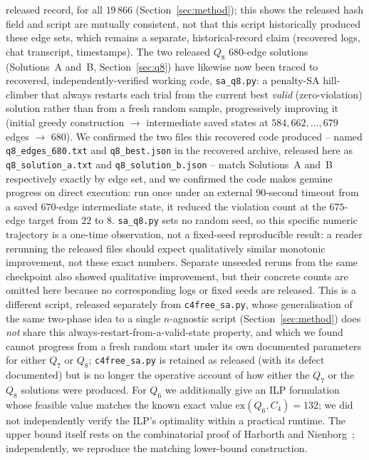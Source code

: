 \documentclass[12pt,a4paper]{article}
\theoremstyle{definition}
\newcommand{\ex}{\mathrm{ex}}
\begin{document}
released record, for all $19\,866$ (Section~\ref{sec:method}); this
shows the released hash field and script are mutually consistent, not
that this script historically produced these edge sets, which remains
a separate, historical-record claim (recovered logs, chat transcript,
timestamps). The two released
$Q_8$ $680$-edge solutions (Solutions~A and~B, Section~\ref{sec:q8})
have likewise now been traced to recovered, independently-verified
working code, \texttt{sa\_q8.py}: a penalty-SA hill-climber that always
restarts each trial from the current best \emph{valid} (zero-violation)
solution rather than from a fresh random sample, progressively
improving it (initial greedy construction $\to$ intermediate saved
states at $584,662,\ldots,679$ edges $\to$ $680$). We confirmed the two
files this recovered code produced -- named \texttt{q8\_edges\_680.txt}
and \texttt{q8\_best.json} in the recovered archive, released here as
\texttt{q8\_solution\_a.txt} and \texttt{q8\_solution\_b.json} -- match Solutions~A and~B respectively
exactly by edge set, and we confirmed the code makes genuine
progress on direct execution: run once under an external $90$-second
timeout from a saved
$670$-edge intermediate state, it reduced the violation count at the
$675$-edge target from $22$ to $8$. \texttt{sa\_q8.py} sets no random
seed, so this specific numeric trajectory is a one-time observation,
not a fixed-seed reproducible result: a reader rerunning the released
files should expect qualitatively similar monotonic improvement, not
these exact numbers. Separate unseeded reruns from the same checkpoint
also showed qualitative improvement, but their concrete counts are omitted
here because no corresponding logs or fixed seeds are released. This is a different script,
released separately from \texttt{c4free\_sa.py}, whose
generalisation of the same two-phase idea to a single $n$-agnostic
script (Section~\ref{sec:method}) does \emph{not} share this
always-restart-from-a-valid-state property, and which we found cannot
progress from a fresh random start under its own documented parameters
for either $Q_7$ or $Q_8$; \texttt{c4free\_sa.py} is retained as
released (with its defect documented) but is no longer the operative
account of how either the $Q_7$ or the $Q_8$ solutions were produced.
For $Q_6$ we additionally give an ILP formulation whose
feasible value matches the known exact value $\ex(Q_6,C_4)=132$; we did
not independently verify the ILP's optimality within a practical
runtime. The upper bound itself rests on the combinatorial proof
of Harborth and Nienborg~\cite{HN94}; independently, we reproduce the
matching lower-bound construction.
\end{document}
